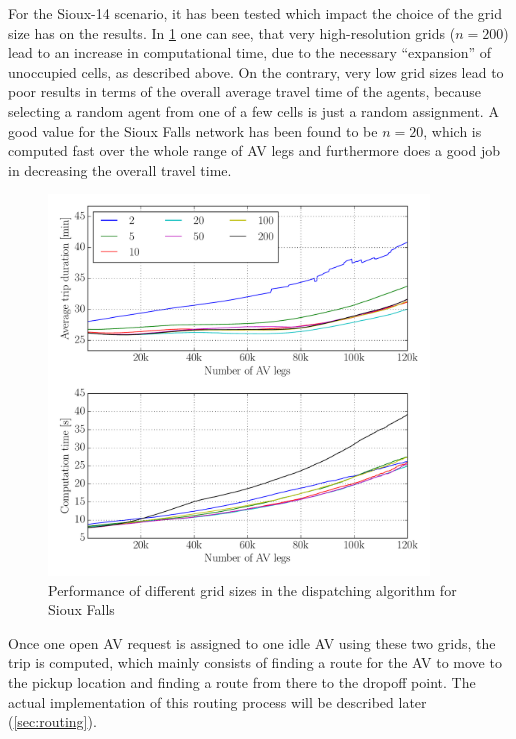 For the Sioux-14 scenario, it has been tested which impact the choice of the grid
size has on the results. In \cref{fig:gridsize} one can see, that very high-resolution
grids ($n=200$) lead to an increase in computational time, due to the necessary
``expansion'' of unoccupied cells, as described above. On the contrary, very low
grid sizes lead to poor results in terms of the overall average travel time of
the agents, because selecting a random agent from one of a few cells is
just a random assignment. A good value for the Sioux Falls network has been found to
be $n=20$, which is computed fast over the whole range of AV legs and furthermore
does a good job in decreasing the overall travel time.

\begin{figure}
    \centering
    \includegraphics[width=0.9\textwidth]{figures/gridsize.pdf}
    \caption{Performance of different grid sizes in the dispatching algorithm for Sioux Falls}
    \label{fig:gridsize}
\end{figure}

Once one open AV request is assigned to one idle AV using these two grids, the
trip is computed, which mainly consists of finding a route for the AV to move
to the pickup location and finding a route from there to the dropoff point. The
actual implementation of this routing process will be described later (\cref{sec:routing}).

